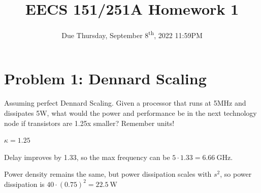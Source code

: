 

\def\PYZsq{\textquotesingle}

\newcommand{\assignmentname}{EECS 151/251A Homework 1}
\newcommand{\versionstamp}{Version: 1 - \DTMnow}

\title{\vspace{-0.4in}\Large \bf \assignmentname \vspace{-0.1in}}
\author{Due Thursday, September 8\textsuperscript{th}, 2022 11:59PM}

\date{}
\maketitle

\thispagestyle{plain}

\section*{Problem 1: Dennard Scaling}
Assuming perfect Dennard Scaling. Given a processor that runs at 5MHz and dissipates 5W, what would the power and performance be in the next technology node if transistors are 1.25x smaller? Remember units!

\begin{solution}
$\kappa = 1.25$

Delay improves by 1.33, so the max frequency can be $5 \cdot 1.33 = \SI{6.66}{\giga\hertz}$.

Power density remains the same, but power dissipation scales with $s^2$, so power dissipation is $40 \cdot (0.75)^2 = \SI{22.5}{\watt}$
\end{solution}

